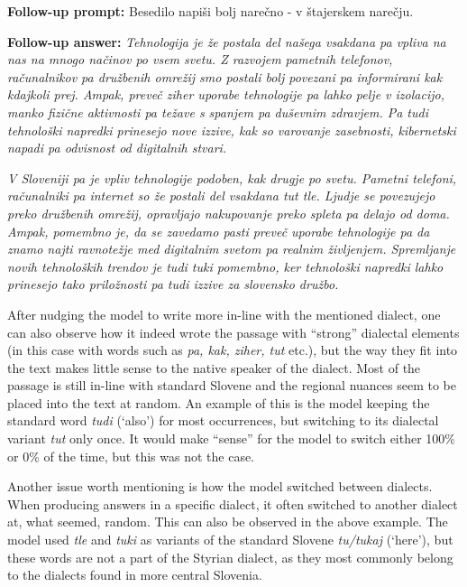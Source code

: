 \documentclass[fleqn,moreauthors,10pt]{ds_report}
\begin{document}
\textbf{Follow-up prompt:}
Besedilo napiši bolj narečno - v štajerskem narečju.

\textbf{Follow-up answer:}
\textit{Tehnologija je že postala del našega vsakdana pa vpliva na nas na mnogo načinov po vsem svetu. Z razvojem pametnih telefonov, računalnikov pa družbenih omrežij smo postali bolj povezani pa informirani kak kdajkoli prej. Ampak, preveč ziher uporabe tehnologije pa lahko pelje v izolacijo, manko fizične aktivnosti pa težave s spanjem pa duševnim zdravjem. Pa tudi tehnološki napredki prinesejo nove izzive, kak so varovanje zasebnosti, kibernetski napadi pa odvisnost od digitalnih stvari.}

\textit{V Sloveniji pa je vpliv tehnologije podoben, kak drugje po svetu. Pametni telefoni, računalniki pa internet so že postali del vsakdana tut tle. Ljudje se povezujejo preko družbenih omrežij, opravljajo nakupovanje preko spleta pa delajo od doma. Ampak, pomembno je, da se zavedamo pasti preveč uporabe tehnologije pa da znamo najti ravnotežje med digitalnim svetom pa realnim življenjem. Spremljanje novih tehnoloških trendov je tudi tuki pomembno, ker tehnološki napredki lahko prinesejo tako priložnosti pa tudi izzive za slovensko družbo.}

    After nudging the model to write more in-line with the mentioned dialect, one can also observe how it indeed wrote the passage with “strong” dialectal elements (in this case with words such as \textit{pa, kak, ziher, tut }etc.), but the way they fit into the text makes little sense to the native speaker of the dialect. Most of the passage is still in-line with standard Slovene and the regional nuances seem to be placed into the text at random. An example of this is the model keeping the standard word \textit{tudi }(‘also’) for most occurrences, but switching to its dialectal variant \textit{tut} only once. It would make “sense” for the model to switch either 100\% or 0\% of the time, but this was not the case.

    Another issue worth mentioning is how the model switched between dialects. When producing answers in a specific dialect, it often switched to another dialect at, what seemed, random. This can also be observed in the above example. The model used \textit{tle }and \textit{tuki} as variants of the standard Slovene \textit{tu/tukaj }(‘here’), but these words are not a part of the Styrian dialect, as they most commonly belong to the dialects found in more central Slovenia.
\end{document}
